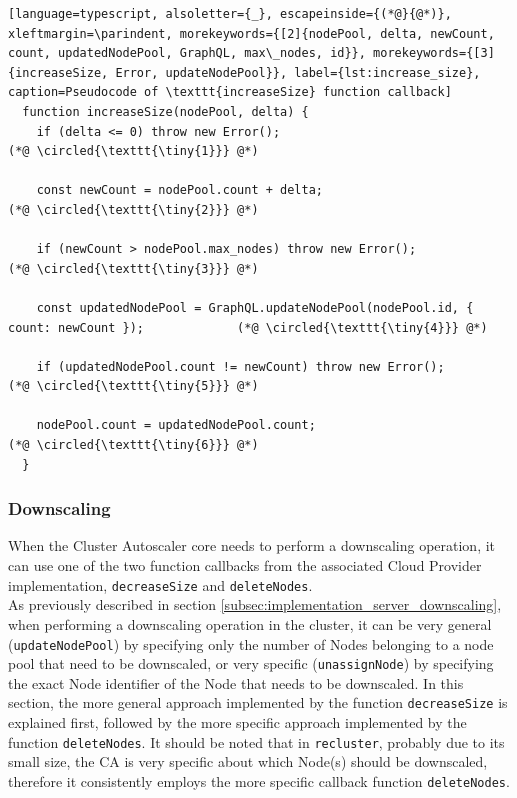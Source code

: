 \begin{lstlisting}[language=typescript, alsoletter={_}, escapeinside={(*@}{@*)}, xleftmargin=\parindent, morekeywords={[2]{nodePool, delta, newCount, count, updatedNodePool, GraphQL, max\_nodes, id}}, morekeywords={[3]{increaseSize, Error, updateNodePool}}, label={lst:increase_size}, caption=Pseudocode of \texttt{increaseSize} function callback]
  function increaseSize(nodePool, delta) {
    if (delta <= 0) throw new Error();                                                            (*@ \circled{\texttt{\tiny{1}}} @*)

    const newCount = nodePool.count + delta;                                                      (*@ \circled{\texttt{\tiny{2}}} @*)

    if (newCount > nodePool.max_nodes) throw new Error();                                         (*@ \circled{\texttt{\tiny{3}}} @*)

    const updatedNodePool = GraphQL.updateNodePool(nodePool.id, { count: newCount });             (*@ \circled{\texttt{\tiny{4}}} @*)

    if (updatedNodePool.count != newCount) throw new Error();                                     (*@ \circled{\texttt{\tiny{5}}} @*)

    nodePool.count = updatedNodePool.count;                                                       (*@ \circled{\texttt{\tiny{6}}} @*)
  }
\end{lstlisting}

\subsubsection{Downscaling}
\label{subsubsec:implementation_autoscaling_cluster_autoscaler_downscaling}

When the Cluster Autoscaler core needs to perform a downscaling operation, it can
use one of the two function callbacks from the associated Cloud Provider implementation,
\texttt{decreaseSize} and \texttt{deleteNodes}. \\ %
As previously described in section
\ref{subsec:implementation_server_downscaling}, when performing a downscaling operation
in the cluster, it can be very general (\texttt{updateNodePool}) by specifying only
the number of Nodes belonging to a node pool that need to be downscaled, or very
specific (\texttt{unassignNode}) by specifying the exact Node identifier of the Node
that needs to be downscaled. In this section, the more general approach implemented
by the function \texttt{decreaseSize} is explained first, followed by the more specific
approach implemented by the function \texttt{deleteNodes}. It should be noted that
in \texttt{recluster}, probably due to its small size, the CA is very specific
about which Node(s) should be downscaled, therefore it consistently employs the
more specific callback function \texttt{deleteNodes}. \\ %

